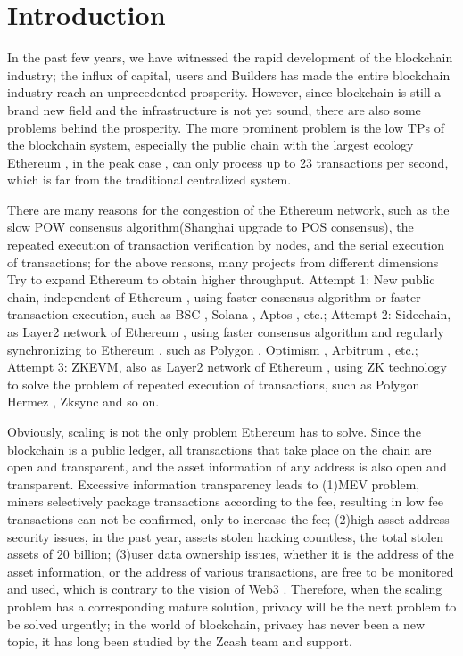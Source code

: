 \section{Introduction}
In the past few years, we have witnessed the rapid development of the blockchain industry; 
the influx of capital, users and Builders has made the entire blockchain industry reach 
an unprecedented prosperity. However, since blockchain is still a brand new field and the
infrastructure is not yet sound, there are also some problems behind the prosperity. 
The more prominent problem is the low TPs of the blockchain system, especially the public
chain with the largest ecology Ethereum \cite{website:Ethereum}, in the peak case \cite{website:Etherscan-chart}, can only process up to 23 
transactions per second, which is far from the traditional centralized system. 

There are many reasons for the congestion of the Ethereum \cite{website:Ethereum} network, such as the slow POW \cite{website:POW} 
consensus algorithm(Shanghai upgrade \cite{website:Shanghai-upgrade} to POS \cite{website:POS} consensus), the repeated execution of 
transaction verification by nodes, and the serial execution of transactions; 
for the above reasons, many projects from different dimensions Try to expand Ethereum 
to obtain higher throughput. Attempt 1: New public chain, independent of Ethereum \cite{website:Ethereum}, 
using faster consensus algorithm or faster transaction execution, such as BSC \cite{website:BSC}, Solana \cite{website:Solana}, 
Aptos \cite{website:Aptos}, etc.; Attempt 2: Sidechain, as Layer2 network of Ethereum \cite{website:Ethereum}, using faster consensus
algorithm and regularly synchronizing to Ethereum \cite{website:Ethereum}, such as Polygon \cite{website:Polygon}, Optimism \cite{website:Optimism}, Arbitrum \cite{website:Arbitrum},
etc.; Attempt 3: ZKEVM, also as Layer2 network of Ethereum \cite{website:Ethereum}, using ZK technology to 
solve the problem of repeated execution of transactions, such as Polygon Hermez \cite{website:Polygon-Hermez}, 
Zksync \cite{website:Zksync} and so on.

Obviously, scaling is not the only problem Ethereum \cite{website:Ethereum} has to solve. Since the blockchain is 
a public ledger, all transactions that take place on the chain are open and transparent, 
and the asset information of any address is also open and transparent. Excessive 
information transparency leads to (1)MEV problem, miners selectively package 
transactions according to the fee, resulting in low fee transactions can not be 
confirmed, only to increase the fee; (2)high asset address security issues, in the past 
year, assets stolen hacking countless, the total stolen assets of 20 billion; (3)user data 
ownership issues, whether it is the address of the asset information, or the address of 
various transactions, are free to be monitored and used, which is contrary to 
the vision of Web3 \cite{website:Web3} . Therefore, when the scaling problem has a corresponding mature 
solution, privacy will be the next problem to be solved urgently; in the world of 
blockchain, privacy has never been a new topic, it has long been studied by the Zcash \cite{website:Zcash} team 
and support.


